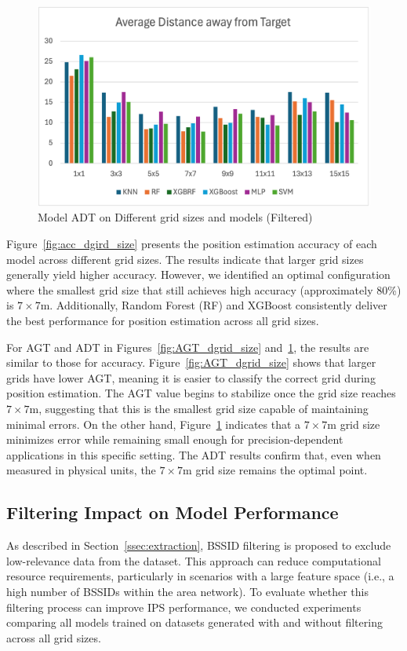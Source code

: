 \documentclass[runningheads]{llncs}
\begin{document}
\begin{figure}[thb!]
        \centering
        \includegraphics[width=.45\linewidth]{figures/overview_filtered_adt.png}
        \caption{Model ADT on Different grid sizes and models (Filtered)}
        \label{fig:ADT_dgrid_size}
\end{figure}

Figure~\ref{fig:acc_dgird_size} presents the position estimation accuracy of each model across different grid sizes. The results indicate that larger grid sizes generally yield higher accuracy. However, we identified an optimal configuration where the smallest grid size that still achieves high accuracy (approximately 80\%) is $7\times7$m. Additionally, Random Forest (RF) and XGBoost consistently deliver the best performance for position estimation across all grid sizes.

For AGT and ADT in Figures~\ref{fig:AGT_dgrid_size} and~\ref{fig:ADT_dgrid_size}, the results are similar to those for accuracy. Figure~\ref{fig:AGT_dgrid_size} shows that larger grids have lower AGT, meaning it is easier to classify the correct grid during position estimation. The AGT value begins to stabilize once the grid size reaches $7\times7$m, suggesting that this is the smallest grid size capable of maintaining minimal errors. On the other hand, Figure~\ref{fig:ADT_dgrid_size} indicates that a $7\times7$m grid size minimizes error while remaining small enough for precision-dependent applications in this specific setting. The ADT results confirm that, even when measured in physical units, the $7\times7$m grid size remains the optimal point.

\subsection{Filtering Impact on Model Performance}\label{ssec:filtering-impact}

As described in Section~\ref{ssec:extraction}, BSSID filtering is proposed to exclude low-relevance data from the dataset. This approach can reduce computational resource requirements, particularly in scenarios with a large feature space (i.e., a high number of BSSIDs within the area network). To evaluate whether this filtering process can improve IPS performance, we conducted experiments comparing all models trained on datasets generated with and without filtering across all grid sizes.
\end{document}
